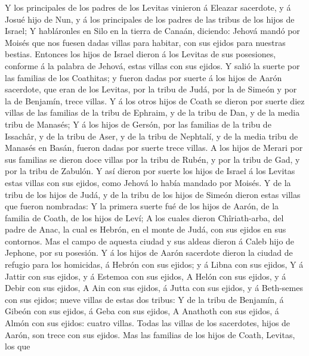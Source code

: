  Y los principales de los padres de los Levitas vinieron á
Eleazar sacerdote, y á Josué hijo de Nun, y á los principales de los
padres de las tribus de los hijos de Israel;  Y habláronles
en Silo en la tierra de Canaán, diciendo: Jehová mandó por Moisés que
nos fuesen dadas villas para habitar, con sus ejidos para nuestras
bestias.  Entonces los hijos de Israel dieron á los Levitas
de sus posesiones, conforme á la palabra de Jehová, estas villas con sus
ejidos.  Y salió la suerte por las familias de los
Coathitas; y fueron dadas por suerte á los hijos de Aarón sacerdote, que
eran de los Levitas, por la tribu de Judá, por la de Simeón y por la de
Benjamín, trece villas.  Y á los otros hijos de Coath se
dieron por suerte diez villas de las familias de la tribu de Ephraim, y
de la tribu de Dan, y de la media tribu de Manasés;  Y á los
hijos de Gersón, por las familias de la tribu de Issachâr, y de la tribu
de Aser, y de la tribu de Nephtalí, y de la media tribu de Manasés en
Basán, fueron dadas por suerte trece villas.  A los hijos de
Merari por sus familias se dieron doce villas por la tribu de Rubén, y
por la tribu de Gad, y por la tribu de Zabulón.  Y así
dieron por suerte los hijos de Israel á los Levitas estas villas con sus
ejidos, como Jehová lo había mandado por Moisés.  Y de la
tribu de los hijos de Judá, y de la tribu de los hijos de Simeón dieron
estas villas que fueron nombradas:  Y la primera suerte fué
de los hijos de Aarón, de la familia de Coath, de los hijos de Leví;
 A los cuales dieron Chîriath-arba, del padre de Anac, la
cual es Hebrón, en el monte de Judá, con sus ejidos en sus contornos.
 Mas el campo de aquesta ciudad y sus aldeas dieron á Caleb
hijo de Jephone, por su posesión.  Y á los hijos de Aarón
sacerdote dieron la ciudad de refugio para los homicidas, á Hebrón con
sus ejidos; y á Libna con sus ejidos,  Y á Jattir con sus
ejidos, y á Estemoa con sus ejidos,  A Helón con sus
ejidos, y á Debir con sus ejidos,  A Ain con sus ejidos, á
Jutta con sus ejidos, y á Beth-semes con sus ejidos; nueve villas de
estas dos tribus:  Y de la tribu de Benjamín, á Gibeón con
sus ejidos, á Geba con sus ejidos,  A Anathoth con sus
ejidos, á Almón con sus ejidos: cuatro villas.  Todas las
villas de los sacerdotes, hijos de Aarón, son trece con sus ejidos.
 Mas las familias de los hijos de Coath, Levitas, los que
